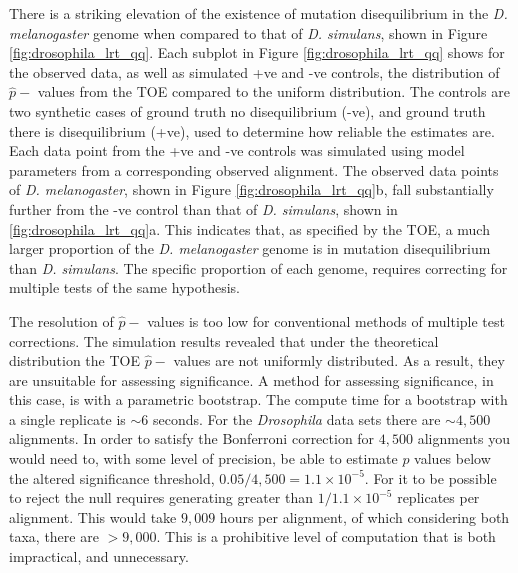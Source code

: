 There is a striking elevation of the existence of mutation disequilibrium in the \textit{D. melanogaster} genome when compared to that of \textit{D. simulans}, shown in Figure \ref{fig:drosophila_lrt_qq}. Each subplot in Figure \ref{fig:drosophila_lrt_qq} shows for the observed data, as well as simulated +ve and -ve controls, the distribution of $\hat p-$ values from the TOE compared to the uniform distribution. The controls are two synthetic cases of ground truth no disequilibrium (-ve), and ground truth there is disequilibrium (+ve), used to determine how reliable the estimates are. Each data point from the +ve and -ve controls was simulated using model parameters from a corresponding observed alignment.  The observed data points of \textit{D. melanogaster}, shown in Figure \ref{fig:drosophila_lrt_qq}b, fall substantially further from the -ve control than that of \textit{D. simulans}, shown in \ref{fig:drosophila_lrt_qq}a. This indicates that, as specified by the TOE, a much larger proportion of the \textit{D. melanogaster} genome is in mutation disequilibrium than \textit{D. simulans}. The specific proportion of each genome, requires correcting for multiple tests of the same hypothesis. 



The resolution of $\hat p-$ values is too low for conventional methods of multiple test corrections. The simulation results revealed that under the theoretical distribution the TOE  $\hat p-$ values are not uniformly distributed. As a result, they are unsuitable for assessing significance. A method for assessing significance, in this case, is with a parametric bootstrap. The compute time for a bootstrap with a single replicate is ${\sim} 6$ seconds. For the \textit{Drosophila} data sets there are ${\sim} 4,500$ alignments. In order to satisfy the Bonferroni correction for $4,500$ alignments you would need to, with some level of precision, be able to estimate $p$ values below the altered significance threshold, $0.05/4,500 = 1.1{\times}10^{-5}$. For it to be possible to reject the null requires generating greater than $1/1.1{\times}10^{-5}$ replicates per alignment. This would take $9,009$ hours per alignment, of which considering both taxa, there are $>9,000$. This is a prohibitive level of computation that is both impractical, and unnecessary. 

